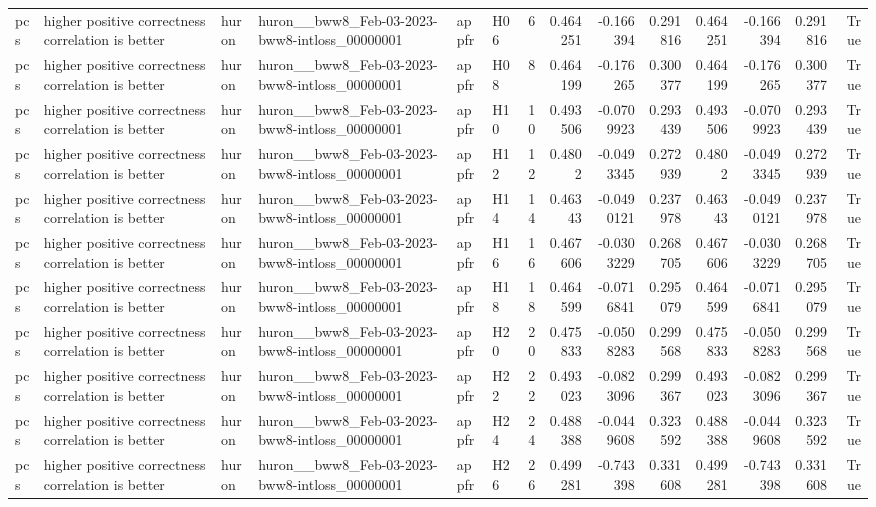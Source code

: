 \begin{longtable}{llllllrrrrrrrr}
pcs & higher positive correctness correlation is better & huron & huron\_\_bww8\_Feb-03-2023-bww8-intloss\_00000001 & appfr & H06 & 6 & 0.464251 & -0.166394 & 0.291816 & 0.464251 & -0.166394 & 0.291816 & True \\
pcs & higher positive correctness correlation is better & huron & huron\_\_bww8\_Feb-03-2023-bww8-intloss\_00000001 & appfr & H08 & 8 & 0.464199 & -0.176265 & 0.300377 & 0.464199 & -0.176265 & 0.300377 & True \\
pcs & higher positive correctness correlation is better & huron & huron\_\_bww8\_Feb-03-2023-bww8-intloss\_00000001 & appfr & H10 & 10 & 0.493506 & -0.0709923 & 0.293439 & 0.493506 & -0.0709923 & 0.293439 & True \\
pcs & higher positive correctness correlation is better & huron & huron\_\_bww8\_Feb-03-2023-bww8-intloss\_00000001 & appfr & H12 & 12 & 0.4802 & -0.0493345 & 0.272939 & 0.4802 & -0.0493345 & 0.272939 & True \\
pcs & higher positive correctness correlation is better & huron & huron\_\_bww8\_Feb-03-2023-bww8-intloss\_00000001 & appfr & H14 & 14 & 0.46343 & -0.0490121 & 0.237978 & 0.46343 & -0.0490121 & 0.237978 & True \\
pcs & higher positive correctness correlation is better & huron & huron\_\_bww8\_Feb-03-2023-bww8-intloss\_00000001 & appfr & H16 & 16 & 0.467606 & -0.0303229 & 0.268705 & 0.467606 & -0.0303229 & 0.268705 & True \\
pcs & higher positive correctness correlation is better & huron & huron\_\_bww8\_Feb-03-2023-bww8-intloss\_00000001 & appfr & H18 & 18 & 0.464599 & -0.0716841 & 0.295079 & 0.464599 & -0.0716841 & 0.295079 & True \\
pcs & higher positive correctness correlation is better & huron & huron\_\_bww8\_Feb-03-2023-bww8-intloss\_00000001 & appfr & H20 & 20 & 0.475833 & -0.0508283 & 0.299568 & 0.475833 & -0.0508283 & 0.299568 & True \\
pcs & higher positive correctness correlation is better & huron & huron\_\_bww8\_Feb-03-2023-bww8-intloss\_00000001 & appfr & H22 & 22 & 0.493023 & -0.0823096 & 0.299367 & 0.493023 & -0.0823096 & 0.299367 & True \\
pcs & higher positive correctness correlation is better & huron & huron\_\_bww8\_Feb-03-2023-bww8-intloss\_00000001 & appfr & H24 & 24 & 0.488388 & -0.0449608 & 0.323592 & 0.488388 & -0.0449608 & 0.323592 & True \\
pcs & higher positive correctness correlation is better & huron & huron\_\_bww8\_Feb-03-2023-bww8-intloss\_00000001 & appfr & H26 & 26 & 0.499281 & -0.743398 & 0.331608 & 0.499281 & -0.743398 & 0.331608 & True \\

\end{longtable}
